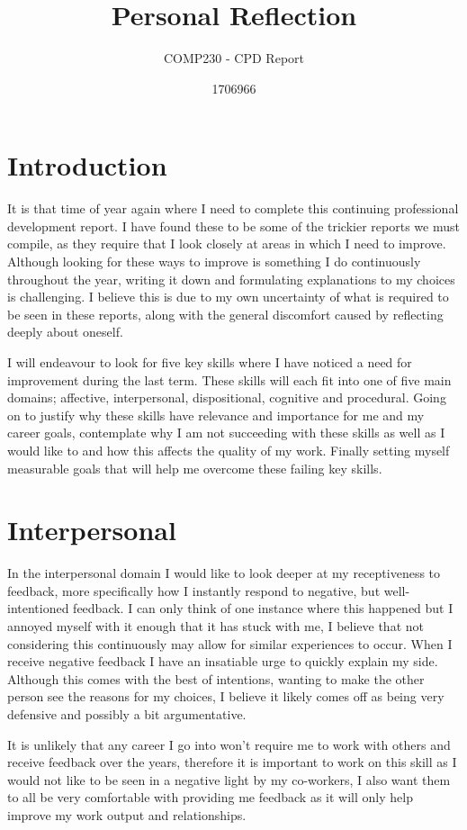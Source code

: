 \documentclass{scrartcl}
\title{Personal Reflection}
\subtitle{COMP230 - CPD Report}
\author{1706966}
\begin{document}
\maketitle

\section{Introduction}
It is that time of year again where I need to complete this continuing professional development report. I have found these to be some of the trickier reports we must compile, as they require that I look closely at areas in which I need to improve. Although looking for these ways to improve is something I do continuously throughout the year, writing it down and formulating explanations to my choices is challenging. I believe this is due to my own uncertainty of what is required to be seen in these reports, along with the general discomfort caused by reflecting deeply about oneself.

I will endeavour to look for five key skills where I have noticed a need for improvement during the last term. These skills will each fit into one of five main domains; affective, interpersonal, dispositional, cognitive and procedural. Going on to justify why these skills have relevance and importance for me and my career goals, contemplate why I am not succeeding with these skills as well as I would like to and how this affects the quality of my work. Finally setting myself measurable goals that will help me overcome these failing key skills.

\section{Interpersonal}
In the interpersonal domain I would like to look deeper at my receptiveness to feedback, more specifically how I instantly respond to negative, but well-intentioned feedback. I can only think of one instance where this happened but I annoyed myself with it enough that it has stuck with me, I believe that not considering this continuously may allow for similar experiences to occur. When I receive negative feedback I have an insatiable urge to quickly explain my side. Although this comes with the best of intentions, wanting to make the other person see the reasons for my choices, I believe it likely comes off as being very defensive and possibly a bit argumentative. 

It is unlikely that any career I go into won't require me to work with others and receive feedback over the years, therefore it is important to work on this skill as I would not like to be seen in a negative light by my co-workers, I also want them to all be very comfortable with providing me feedback as it will only help improve my work output and relationships.
\end{document}
